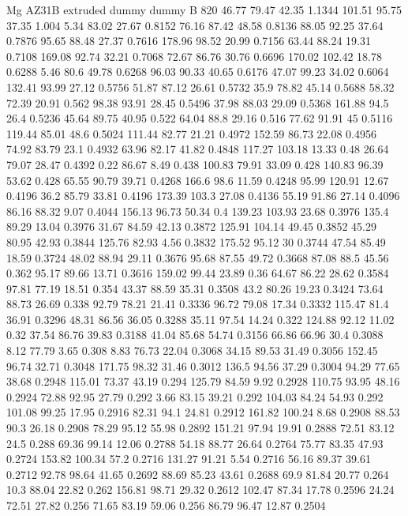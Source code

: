Mg AZ31B extruded
dummy
dummy
B 820
46.77	79.47	42.35	1.1344
101.51	95.75	37.35	1.004
5.34	83.02	27.67	0.8152
76.16	87.42	48.58	0.8136
88.05	92.25	37.64	0.7876
95.65	88.48	27.37	0.7616
178.96	98.52	20.99	0.7156
63.44	88.24	19.31	0.7108
169.08	92.74	32.21	0.7068
72.67	86.76	30.76	0.6696
170.02	102.42	18.78	0.6288
5.46	80.6	49.78	0.6268
96.03	90.33	40.65	0.6176
47.07	99.23	34.02	0.6064
132.41	93.99	27.12	0.5756
51.87	87.12	26.61	0.5732
35.9	78.82	45.14	0.5688
58.32	72.39	20.91	0.562
98.38	93.91	28.45	0.5496
37.98	88.03	29.09	0.5368
161.88	94.5	26.4	0.5236
45.64	89.75	40.95	0.522
64.04	88.8	29.16	0.516
77.62	91.91	45	0.5116
119.44	85.01	48.6	0.5024
111.44	82.77	21.21	0.4972
152.59	86.73	22.08	0.4956
74.92	83.79	23.1	0.4932
63.96	82.17	41.82	0.4848
117.27	103.18	13.33	0.48
26.64	79.07	28.47	0.4392
0.22	86.67	8.49	0.438
100.83	79.91	33.09	0.428
140.83	96.39	53.62	0.428
65.55	90.79	39.71	0.4268
166.6	98.6	11.59	0.4248
95.99	120.91	12.67	0.4196
36.2	85.79	33.81	0.4196
173.39	103.3	27.08	0.4136
55.19	91.86	27.14	0.4096
86.16	88.32	9.07	0.4044
156.13	96.73	50.34	0.4
139.23	103.93	23.68	0.3976
135.4	89.29	13.04	0.3976
31.67	84.59	42.13	0.3872
125.91	104.14	49.45	0.3852
45.29	80.95	42.93	0.3844
125.76	82.93	4.56	0.3832
175.52	95.12	30	0.3744
47.54	85.49	18.59	0.3724
48.02	88.94	29.11	0.3676
95.68	87.55	49.72	0.3668
87.08	88.5	45.56	0.362
95.17	89.66	13.71	0.3616
159.02	99.44	23.89	0.36
64.67	86.22	28.62	0.3584
97.81	77.19	18.51	0.354
43.37	88.59	35.31	0.3508
43.2	80.26	19.23	0.3424
73.64	88.73	26.69	0.338
92.79	78.21	21.41	0.3336
96.72	79.08	17.34	0.3332
115.47	81.4	36.91	0.3296
48.31	86.56	36.05	0.3288
35.11	97.54	14.24	0.322
124.88	92.12	11.02	0.32
37.54	86.76	39.83	0.3188
41.04	85.68	54.74	0.3156
66.86	66.96	30.4	0.3088
8.12	77.79	3.65	0.308
8.83	76.73	22.04	0.3068
34.15	89.53	31.49	0.3056
152.45	96.74	32.71	0.3048
171.75	98.32	31.46	0.3012
136.5	94.56	37.29	0.3004
94.29	77.65	38.68	0.2948
115.01	73.37	43.19	0.294
125.79	84.59	9.92	0.2928
110.75	93.95	48.16	0.2924
72.88	92.95	27.79	0.292
3.66	83.15	39.21	0.292
104.03	84.24	54.93	0.292
101.08	99.25	17.95	0.2916
82.31	94.1	24.81	0.2912
161.82	100.24	8.68	0.2908
88.53	90.3	26.18	0.2908
78.29	95.12	55.98	0.2892
151.21	97.94	19.91	0.2888
72.51	83.12	24.5	0.288
69.36	99.14	12.06	0.2788
54.18	88.77	26.64	0.2764
75.77	83.35	47.93	0.2724
153.82	100.34	57.2	0.2716
131.27	91.21	5.54	0.2716
56.16	89.37	39.61	0.2712
92.78	98.64	41.65	0.2692
88.69	85.23	43.61	0.2688
69.9	81.84	20.77	0.264
10.3	88.04	22.82	0.262
156.81	98.71	29.32	0.2612
102.47	87.34	17.78	0.2596
24.24	72.51	27.82	0.256
71.65	83.19	59.06	0.256
86.79	96.47	12.87	0.2504

